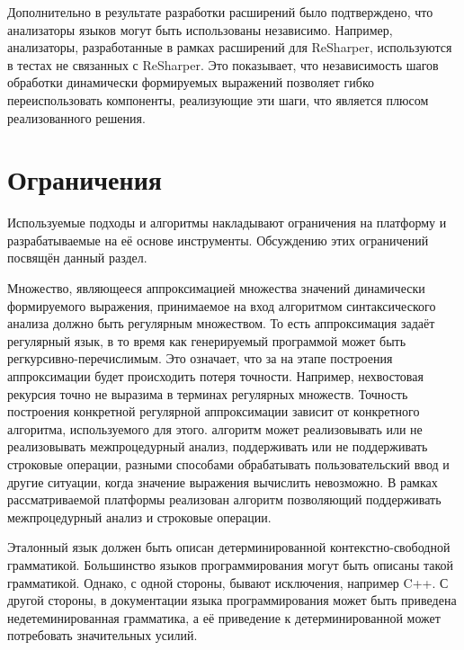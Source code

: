 Дополнительно в результате разработки расширений было подтверждено, что анализаторы языков могут быть использованы независимо. Например, анализаторы, разработанные в рамках расширений для ReSharper, используются в тестах не связанных с ReSharper. Это показывает, что независимость шагов обработки динамически формируемых выражений позволяет гибко переиспользовать компоненты, реализующие эти шаги, что является плюсом реализованного решения.

\section{Ограничения}

Используемые подходы и алгоритмы накладывают ограничения на платформу и разрабатываемые на её основе инструменты. Обсуждению этих ограничений посвящён данный раздел.

Множество, являющееся аппроксимацией множества значений динамически формируемого выражения, принимаемое на вход алгоритмом синтаксического анализа должно быть регулярным множеством. То есть аппроксимация задаёт регулярный язык, в то время как генерируемый программой может быть регкурсивно-перечислимым. Это означает, что за на этапе построения аппроксимации будет происходить потеря точности. Например, нехвостовая рекурсия точно не выразима в терминах регулярных множеств. Точность построения конкретной регулярной аппроксимации зависит от конкретного алгоритма, используемого для этого. алгоритм может реализовывать или не реализовывать межпроцедурный анализ, поддерживать или не поддерживать строковые операции, разными способами обрабатывать пользовательский ввод и другие ситуации, когда значение выражения вычислить невозможно. В рамках рассматриваемой платформы реализован алгоритм позволяющий поддерживать межпроцедурный анализ и строковые операции. 

Эталонный язык должен быть описан детерминированной контекстно-свободной грамматикой. Большинство языков программирования могут быть описаны такой грамматикой. Однако, с одной стороны, бывают исключения, например C++. С другой стороны, в документации языка программирования может быть приведена недетеминированная грамматика, а её приведение к детерминированной может потребовать значительных усилий. 

